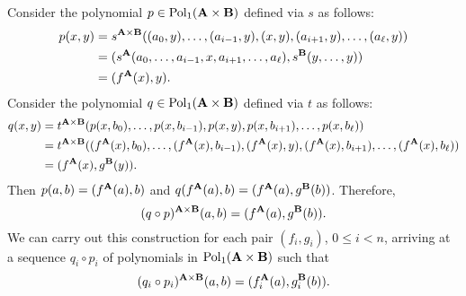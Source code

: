 \bigskip
Consider the polynomial $p \in \operatorname{Pol}_1(\mathbf{A}\times \mathbf{B})$ defined via
$s$ as follows:
\begin{align*}
p(x,y) &= s^{\mathbf{A} \times \mathbf{B}}((a_0, y), \dots, (a_{i-1}, y), (x, y), (a_{i+1}, y), \dots, (a_{\ell}, y))\\
&= (s^{\mathbf{A}} (a_0, \dots, a_{i-1}, x, a_{i+1}, \dots, a_{\ell}), 
s^{\mathbf{B}}(y, \dots, y))\\
&= (f^{\mathbf{A}} (x), y).
\end{align*}
Consider the polynomial $q \in \operatorname{Pol}_1(\mathbf{A}\times \mathbf{B})$ defined via
$t$ as follows:
\begin{align*}
  q(x,y) &= t^{\mathbf{A} \times \mathbf{B}}(p(x,b_0),
  \dots, p(x, b_{i-1}),p(x,y),
  p(x, b_{i+1}), \dots, p(x, b_{\ell}))\\
  &= t^{\mathbf{A} \times \mathbf{B}}((f^{\mathbf{A}}(x), b_0), \dots, (f^{\mathbf{A}}(x), b_{i-1}),(f^{\mathbf{A}}(x),y),
(f^{\mathbf{A}}(x), b_{i+1}), \dots, (f^{\mathbf{A}}(x), b_{\ell}))\\
&= (f^{\mathbf{A}}(x), g^{\mathbf{B}}(y)).
\end{align*}
Then $p(a,b) = (f^{\mathbf{A}}(a), b)$ and $q(f^{\mathbf{A}}(a), b) = (f^{\mathbf{A}}(a),g^{\mathbf{B}}(b))$.
Therefore,
\[
(q\circ p)^{\mathbf{A}\times \mathbf{B}} (a,b) =
(f^{\mathbf{A}} (a), g^{\mathbf{B}} (b)).
\]
We can carry out this construction for each pair $(f_i, g_i)$, $0\leq i < n$,
arriving at a sequence $q_i \circ p_i$ of polynomials in
$\operatorname{Pol}_1(\mathbf{A} \times \mathbf{B})$ such that
\[
(q_i\circ p_i)^{\mathbf{A}\times \mathbf{B}} (a,b) =
(f_i^{\mathbf{A}} (a), g_i^{\mathbf{B}} (b)).
\]





